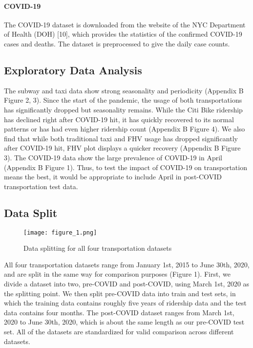 \documentclass{article}
\begin{document}
\paragraph{COVID-19}

The COVID-19 dataset is downloaded from the website of the NYC Department of Health (DOH) [10], which provides the statistics of the confirmed COVID-19 cases and deaths. The dataset is preprocessed to give the daily case counts.

\subsection{Exploratory Data Analysis}
The subway and taxi data show strong seasonality and periodicity (Appendix B Figure 2, 3). Since the start of the pandemic, the usage of both transportations has significantly dropped but seasonality remains. While the Citi Bike ridership has declined right after COVID-19 hit, it has quickly recovered to its normal patterns or has had even higher ridership count (Appendix B Figure 4). We also find that while both traditional taxi and FHV usage has dropped significantly after COVID-19 hit, FHV plot displays a quicker recovery (Appendix B Figure 3). The COVID-19 data show the large prevalence of COVID-19 in April (Appendix B Figure 1). Thus, to test the impact of COVID-19 on transportation means the best, it would be appropriate to include April in post-COVID transportation test data.

\subsection{Data Split}

\begin{figure}[h]
  \centering
  \texttt{[image: figure\_1.png]}
  \caption{Data splitting for all four transportation datasets}
\end{figure}

All four transportation datasets range from January 1st, 2015 to June 30th, 2020, and are split in the same way for comparison purposes (Figure 1). First, we divide a dataset into two, pre-COVID and post-COVID, using March 1st, 2020 as the splitting point. We then split pre-COVID data into train and test sets, in which the training data contains roughly five years of ridership data and the test data contains four months. The post-COVID dataset ranges from March 1st, 2020 to June 30th, 2020, which is about the same length as our pre-COVID test set. All of the datasets are standardized for valid comparison across different datasets. 
\end{document}
